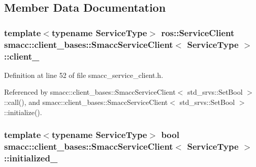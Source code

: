 \subsection{Member Data Documentation}
\subsubsection[{\texorpdfstring{client\+\_\+}{client_}}]{\setlength{\rightskip}{0pt plus 5cm}template$<$typename Service\+Type$>$ ros\+::\+Service\+Client {\bf smacc\+::client\+\_\+bases\+::\+Smacc\+Service\+Client}$<$ Service\+Type $>$\+::client\+\_\+\hspace{0.3cm}{\ttfamily [protected]}}\hypertarget{classsmacc_1_1client__bases_1_1SmaccServiceClient_a632093eb6bc8b058dec492b21c8536f9}{}\label{classsmacc_1_1client__bases_1_1SmaccServiceClient_a632093eb6bc8b058dec492b21c8536f9}


Definition at line 52 of file smacc\+\_\+service\+\_\+client.\+h.



Referenced by smacc\+::client\+\_\+bases\+::\+Smacc\+Service\+Client$<$ std\+\_\+srvs\+::\+Set\+Bool $>$\+::call(), and smacc\+::client\+\_\+bases\+::\+Smacc\+Service\+Client$<$ std\+\_\+srvs\+::\+Set\+Bool $>$\+::initialize().

\subsubsection[{\texorpdfstring{initialized\+\_\+}{initialized_}}]{\setlength{\rightskip}{0pt plus 5cm}template$<$typename Service\+Type$>$ {\bf bool} {\bf smacc\+::client\+\_\+bases\+::\+Smacc\+Service\+Client}$<$ Service\+Type $>$\+::initialized\+\_\+\hspace{0.3cm}{\ttfamily [protected]}}\hypertarget{classsmacc_1_1client__bases_1_1SmaccServiceClient_ad36816c62fc14380a6d0782a2592a5b4}{}\label{classsmacc_1_1client__bases_1_1SmaccServiceClient_ad36816c62fc14380a6d0782a2592a5b4}


